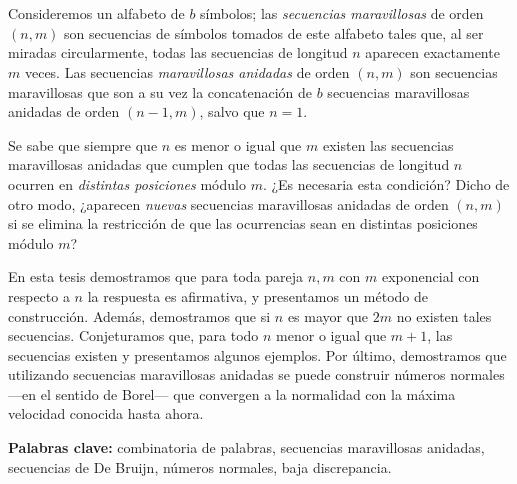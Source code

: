 \chapter*{\runtitulo}

Consideremos un alfabeto de $b$ símbolos; las \emph{secuencias maravillosas}
de orden $(n,m)$ son secuencias de símbolos tomados de este alfabeto
tales que, al ser miradas circularmente, todas las
secuencias de longitud $n$ aparecen exactamente $m$ veces.
Las secuencias \emph{maravillosas anidadas} de orden $(n,m)$ son secuencias
maravillosas que son a su vez la concatenación de $b$ secuencias
maravillosas anidadas de orden $(n-1, m)$, salvo que $n = 1$.

Se sabe que siempre que $n$ es menor o igual que $m$ existen las secuencias
maravillosas anidadas que cumplen que todas las secuencias de longitud $n$
ocurren en \emph{distintas posiciones} módulo $m$.
¿Es necesaria esta condición? Dicho de otro modo, ¿aparecen \emph{nuevas} secuencias
maravillosas anidadas de orden $(n,m)$ si se elimina la restricción de que las
ocurrencias sean en distintas posiciones módulo $m$?

En esta tesis demostramos que para toda pareja $n, m$ con $m$ exponencial con
respecto a $n$ la respuesta es afirmativa, y presentamos un método de construcción.
Además, demostramos que si $n$ es mayor que $2m$ no existen tales secuencias.
Conjeturamos que, para todo $n$ menor o igual que $m + 1$, las secuencias
existen y presentamos algunos ejemplos.
Por último, demostramos que utilizando secuencias maravillosas anidadas se puede
construir números normales ---en el sentido de Borel--- que convergen a la
normalidad con la máxima velocidad conocida hasta ahora.

\bigskip

\noindent\textbf{Palabras clave:}
combinatoria de palabras,
secuencias maravillosas anidadas,
secuencias de De Bruijn,
números normales,
baja discrepancia.
